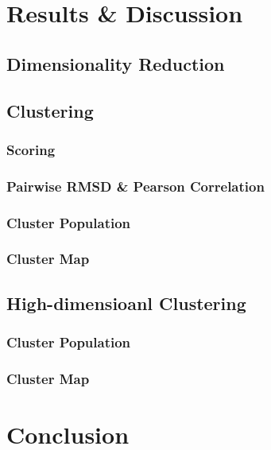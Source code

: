 \documentclass[a4paper]{article}
\begin{document}
\section{Results \& Discussion}

\subsection{Dimensionality Reduction}

\subsection{Clustering}

\subsubsection{Scoring}

\subsubsection{Pairwise RMSD \& Pearson Correlation}

\subsubsection{Cluster Population}

\subsubsection{Cluster Map}

\subsection{High-dimensioanl Clustering}

\subsubsection{Cluster Population}

\subsubsection{Cluster Map}

\section{Conclusion}


\pagebreak


\end{document}
